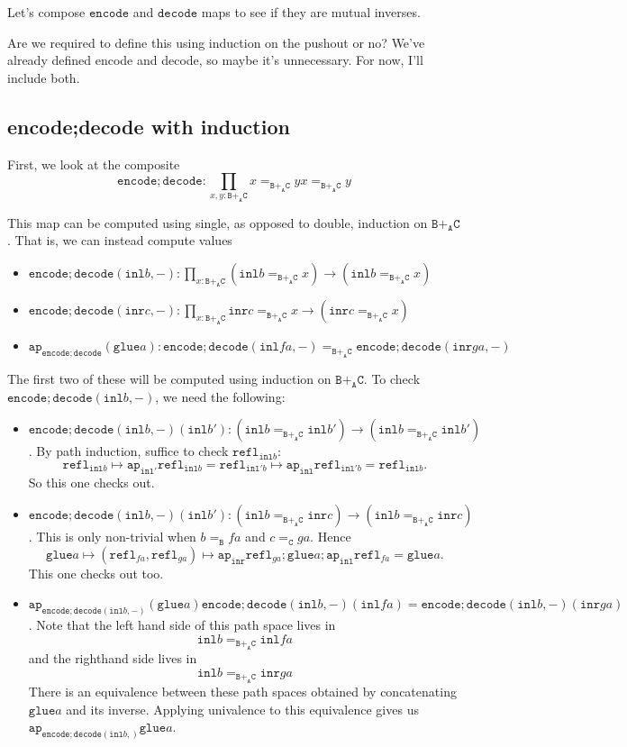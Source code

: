 \message{ !name(notes.tex)}\documentclass[12pt]{amsart}
\newcommand{\from}{\colon}
\newcommand{\edit}[1]{{\color{red} #1 }}
\newcommand{\type}[1]{\mathtt{#1}}
\newcommand{\tin}{\colon}
\newcommand{\A}{\type{A}}
\newcommand{\B}{\type{B}}
\newcommand{\C}{\type{C}}
\newcommand{\BAC}{\B +_{\A} \C}
\newcommand{\ap}{\type{ap}}
\newcommand{\inl}{\type{inl}}
\newcommand{\inr}{\type{inr}}
\newcommand{\glue}{\type{glue}}
\newcommand{\refl}{\type{refl}}
\newcommand{\encode}{\type{encode}}
\newcommand{\decode}{\type{decode}}
\theoremstyle{remark}
\theoremstyle{definition}
\begin{document}
Let's compose \( \encode \) and \( \decode \) maps to see if they are
mutual inverses.  

\edit{ Are we required to define this using induction on the pushout
  or no? We've already defined encode and decode, so maybe it's
  unnecessary. For now, I'll include both.}

\subsection{encode;decode with induction}

First, we look at the composite
\[
  \encode ; \decode
  \from
  \prod\limits_{x,y \tin \BAC} x =_{\BAC} y
  x =_{\BAC} y
\]

This map can be computed using single, as opposed to double, induction
on \( \BAC \). That is, we can instead compute values
\begin{itemize}
\item
  \( \encode ; \decode ( \inl b , - ) \from \prod\limits_{x \tin
  \BAC} ( \inl b =_{\BAC} x ) \to ( \inl b =_{\BAC} x ) \)
\item
  \( \encode ; \decode ( \inr c , - ) \from \prod\limits_{x \tin
  \BAC} \inr c =_{\BAC} x \to ( \inr c =_{\BAC} x ) \)
\item
  \( \ap_{\encode ; \decode} (\glue a ) \tin \encode ; \decode ( \inl
  fa , -  )
  =_{\BAC} \encode ; \decode (\inr ga , - ) \)
\end{itemize}

The first two of these will be computed using induction on \( \BAC
\). To check \( \encode ; \decode ( \inl b , - ) \), we need the
following:
\begin{itemize}
\item
  \( \encode ; \decode ( \inl b , - ) ( \inl b' ) \from ( \inl b
  =_{\BAC} \inl b' ) \to ( \inl b =_{\BAC} \inl b' )  \). By path
  induction, suffice to check \( \refl_{\inl b} \):
  \[
    \refl_{\inl b} \mapsto \ap_{\inl'} \refl_{\inl b}
    = \refl_{\inl' b} \mapsto \ap_{\inl} \refl_{\inl' b} =
    \refl_{\inl b}.
  \]
  So this one checks out.
\item
  \( \encode ; \decode ( \inl b , - ) ( \inl b' ) \from ( \inl b
  =_{\BAC} \inr c ) \to ( \inl b =_{\BAC} \inr c )  \). This is only
  non-trivial when \( b =_\B fa \) and \( c =_\C ga \). Hence
  \[
    \glue a \mapsto ( \refl_{fa} , \refl_{ga} ) \mapsto \ap_{\inr}
    \refl_{ga} ; \glue a ; \ap_{\inl} \refl_{fa} = \glue a.
  \]
  This one checks out too.
\item
  \( \ap_{\encode ; \decode ( \inl b, -)} (\glue a) \encode ; \decode
  (\inl b , -)(\inl fa) = \encode ; \decode (\inl b , -)(\inr ga)
  \). Note that the left hand side of this path space lives in
  \[
    \inl b =_{\BAC} \inl fa
  \]
  and the righthand side lives in
  \[
    \inl b =_{\BAC} \inr ga
  \]
  There is an equivalence between these path spaces obtained by
  concatenating \( \glue a \) and its inverse. Applying univalence to
  this equivalence gives us \( \ap_{\encode ; \decode (\inl b , )}
  \glue a \).
\end{itemize}
\end{document}

